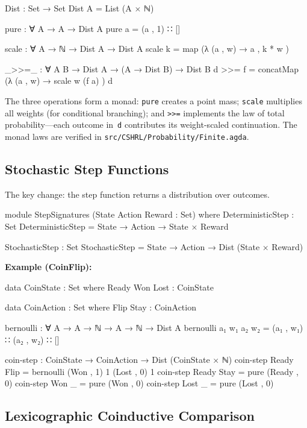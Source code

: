 \documentclass[9pt,a4paper]{article}
\newcommand{\fpath}[1]{\nolinkurl{#1}}
\theoremstyle{plain}
\theoremstyle{definition}
\theoremstyle{remark}
\begin{document}
\begin{code}
  Dist : Set → Set
  Dist A = List (A × ℕ)

  pure : ∀ {A} → A → Dist A
  pure a = (a , 1) ∷ []

  scale : ∀ {A} → ℕ → Dist A → Dist A
  scale k = map (λ { (a , w) → a , k * w })

  _>>=_ : ∀ {A B} → Dist A → (A → Dist B) → Dist B
  d >>= f = concatMap (λ { (a , w) → scale w (f a) }) d
\end{code}

\noindent The three operations form a monad: \texttt{pure} creates a point mass; \texttt{scale} multiplies all weights (for conditional branching); and \texttt{>>=} implements the law of total probability---each outcome in~\texttt{d} contributes its weight-scaled continuation.  The monad laws are verified in \fpath{src/CSHRL/Probability/Finite.agda}.

\subsection{Stochastic Step Functions}

The key change: the step function returns a distribution over outcomes.

\begin{code}[hide]
  module StepSignatures (State Action Reward : Set) where
    DeterministicStep : Set
    DeterministicStep = State → Action → State × Reward

    StochasticStep : Set
    StochasticStep = State → Action → Dist (State × Reward)
\end{code}

\noindent\textbf{Example (CoinFlip):}

\begin{code}
  data CoinState : Set where
    Ready Won Lost : CoinState

  data CoinAction : Set where
    Flip Stay : CoinAction

  bernoulli : ∀ {A} → A → ℕ → A → ℕ → Dist A
  bernoulli a₁ w₁ a₂ w₂ = (a₁ , w₁) ∷ (a₂ , w₂) ∷ []

  coin-step : CoinState → CoinAction → Dist (CoinState × ℕ)
  coin-step Ready Flip = bernoulli (Won , 1) 1 (Lost , 0) 1
  coin-step Ready Stay = pure (Ready , 0)
  coin-step Won   _    = pure (Won , 0)
  coin-step Lost  _    = pure (Lost , 0)
\end{code}

\subsection{Lexicographic Coinductive Comparison}
\end{document}
